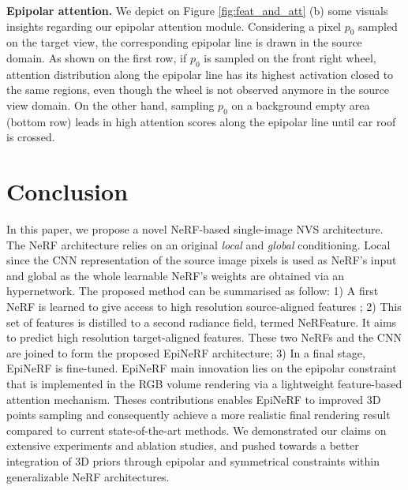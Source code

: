 \noindent \textbf{Epipolar attention.}
We depict on Figure \ref{fig:feat_and_att} (b) some visuals insights regarding our epipolar attention module. Considering a pixel $p_{0}$ sampled on the target view, the corresponding epipolar line is drawn in the source domain. As shown on the first row, if $p_{0}$ is sampled on the front right wheel, attention distribution along the epipolar line has its highest activation closed to the same regions, even though the wheel is not observed anymore in the source view domain. On the other hand, sampling $p_{0}$ on a background empty area (bottom row) leads in high attention scores along the epipolar line until car roof is crossed.  


\section{Conclusion}

In this paper, we propose a novel NeRF-based single-image NVS architecture. The NeRF architecture relies on an original \textit{local} and \textit{global} conditioning. Local since the CNN representation of the source image pixels is used as NeRF's input and global as the whole learnable NeRF's weights are obtained via an hypernetwork. The proposed method can be summarised as follow: 1) A first NeRF is learned to give access to high resolution source-aligned features ; 2) This set of features is distilled to a second radiance field, termed NeRFeature. It aims to predict high resolution target-aligned features. These two NeRFs and the CNN are joined to form the proposed EpiNeRF architecture; 3) In a final stage, EpiNeRF is fine-tuned. EpiNeRF main innovation lies on the epipolar constraint that is implemented in the RGB volume rendering via a lightweight feature-based attention mechanism. Theses contributions enables EpiNeRF to improved 3D points sampling and consequently achieve a more realistic final rendering result compared to current state-of-the-art methods. We demonstrated our claims on extensive experiments and ablation studies, and pushed towards a better integration of 3D priors through epipolar and symmetrical constraints within generalizable NeRF architectures. 
